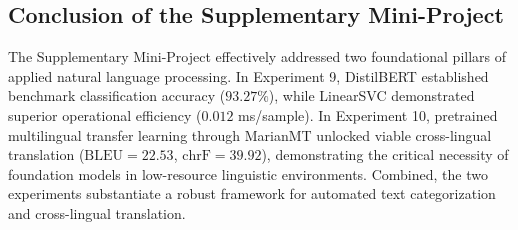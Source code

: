 \subsection{Conclusion of the Supplementary Mini-Project}
The Supplementary Mini-Project effectively addressed two foundational pillars of applied natural language processing. In Experiment 9, DistilBERT established benchmark classification accuracy ($\mathbf{93.27\%}$), while LinearSVC demonstrated superior operational efficiency ($0.012$ ms/sample). In Experiment 10, pretrained multilingual transfer learning through MarianMT unlocked viable cross-lingual translation ($\text{BLEU} = \mathbf{22.53}$, $\text{chrF} = \mathbf{39.92}$), demonstrating the critical necessity of foundation models in low-resource linguistic environments. Combined, the two experiments substantiate a robust framework for automated text categorization and cross-lingual translation.
